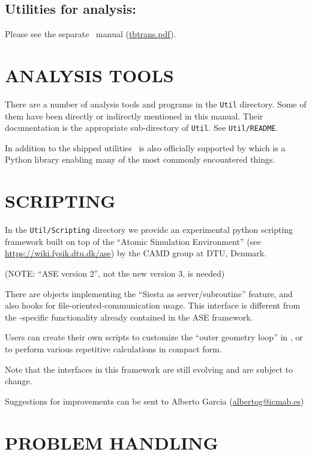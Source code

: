\subsection{Utilities for analysis:
    \texorpdfstring{\tbtrans}{TBtrans}} 

Please see the separate \tbtrans\ manual
(\href{run:tbtrans.pdf}{tbtrans.pdf}). 


\section{ANALYSIS TOOLS}

There are a number of analysis tools and programs in the \texttt{Util}
directory. Some of them have been directly or indirectly mentioned in
this manual. Their documentation is the appropriate sub-directory of
\texttt{Util}. See \texttt{Util/README}.

In addition to the shipped utilities \siesta\ is also officially
supported by \sisl\cite{sisl} which is a Python library enabling many
of the most commonly encountered things.

\section{SCRIPTING}

In the \texttt{Util/Scripting} directory we provide an experimental
python scripting framework built on top of the ``Atomic Simulation
Environment'' (see \url{https://wiki.fysik.dtu.dk/ase}) by the CAMD
group at DTU, Denmark.

(NOTE: ``ASE version 2'', not the new version 3, is needed)

There are objects implementing the ``Siesta as server/subroutine'' feature, and
also hooks for file-oriented-communication usage. This interface is
different from the \siesta-specific functionality already
contained in the ASE framework.

Users can create their own scripts to customize the ``outer geometry loop''
in \siesta, or to perform various repetitive calculations in compact form.

Note that the interfaces in this framework are still evolving and are
subject to change.

Suggestions for improvements can be sent to Alberto Garcia
(\href{mailto:albertog@icmab.es}{albertog@icmab.es})

\section{PROBLEM HANDLING}

